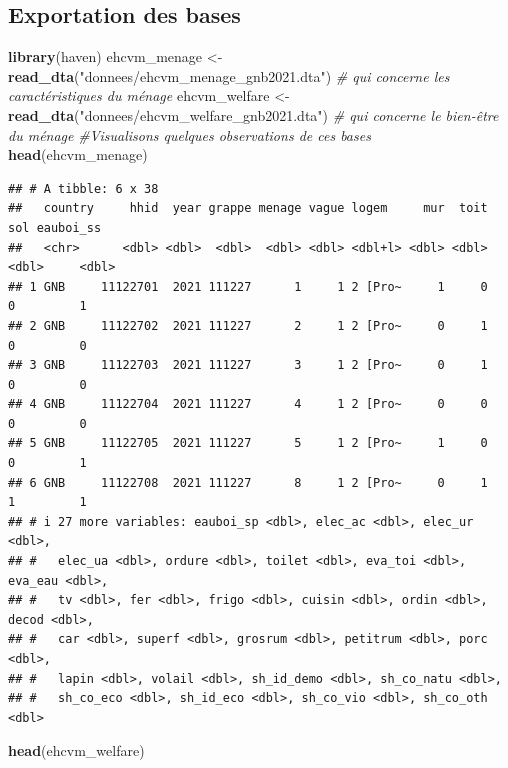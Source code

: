 \documentclass[
]{article}
\newenvironment{Shaded}{\begin{snugshade}}{\end{snugshade}}
\newcommand{\CommentTok}[1]{\textcolor[rgb]{0.56,0.35,0.01}{\textit{#1}}}
\newcommand{\FunctionTok}[1]{\textcolor[rgb]{0.13,0.29,0.53}{\textbf{#1}}}
\newcommand{\NormalTok}[1]{#1}
\newcommand{\OtherTok}[1]{\textcolor[rgb]{0.56,0.35,0.01}{#1}}
\newcommand{\StringTok}[1]{\textcolor[rgb]{0.31,0.60,0.02}{#1}}
\begin{document}
\subsection{Exportation des bases}\label{exportation-des-bases}

\begin{Shaded}
\begin{Highlighting}[]
\FunctionTok{library}\NormalTok{(haven)}
\NormalTok{ehcvm\_menage }\OtherTok{\textless{}{-}} \FunctionTok{read\_dta}\NormalTok{(}\StringTok{"donnees/ehcvm\_menage\_gnb2021.dta"}\NormalTok{) }\CommentTok{\# qui concerne les caractéristiques du ménage}
\NormalTok{ehcvm\_welfare }\OtherTok{\textless{}{-}} \FunctionTok{read\_dta}\NormalTok{(}\StringTok{"donnees/ehcvm\_welfare\_gnb2021.dta"}\NormalTok{) }\CommentTok{\# qui concerne le bien{-}être du ménage}
\CommentTok{\#Visualisons quelques observations de ces bases}
\FunctionTok{head}\NormalTok{(ehcvm\_menage)}
\end{Highlighting}
\end{Shaded}

\begin{verbatim}
## # A tibble: 6 x 38
##   country     hhid  year grappe menage vague logem     mur  toit   sol eauboi_ss
##   <chr>      <dbl> <dbl>  <dbl>  <dbl> <dbl> <dbl+l> <dbl> <dbl> <dbl>     <dbl>
## 1 GNB     11122701  2021 111227      1     1 2 [Pro~     1     0     0         1
## 2 GNB     11122702  2021 111227      2     1 2 [Pro~     0     1     0         0
## 3 GNB     11122703  2021 111227      3     1 2 [Pro~     0     1     0         0
## 4 GNB     11122704  2021 111227      4     1 2 [Pro~     0     0     0         0
## 5 GNB     11122705  2021 111227      5     1 2 [Pro~     1     0     0         1
## 6 GNB     11122708  2021 111227      8     1 2 [Pro~     0     1     1         1
## # i 27 more variables: eauboi_sp <dbl>, elec_ac <dbl>, elec_ur <dbl>,
## #   elec_ua <dbl>, ordure <dbl>, toilet <dbl>, eva_toi <dbl>, eva_eau <dbl>,
## #   tv <dbl>, fer <dbl>, frigo <dbl>, cuisin <dbl>, ordin <dbl>, decod <dbl>,
## #   car <dbl>, superf <dbl>, grosrum <dbl>, petitrum <dbl>, porc <dbl>,
## #   lapin <dbl>, volail <dbl>, sh_id_demo <dbl>, sh_co_natu <dbl>,
## #   sh_co_eco <dbl>, sh_id_eco <dbl>, sh_co_vio <dbl>, sh_co_oth <dbl>
\end{verbatim}

\begin{Shaded}
\begin{Highlighting}[]
\FunctionTok{head}\NormalTok{(ehcvm\_welfare)}
\end{Highlighting}
\end{Shaded}
\end{document}
